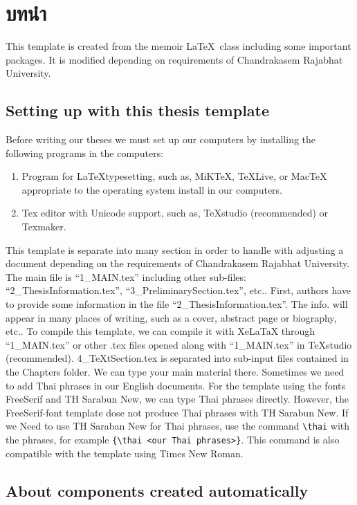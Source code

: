 \chapter{บทนำ}


This template is created from the memoir \LaTeX\ class including some important packages. It is modified depending on requirements of Chandrakasem Rajabhat University.


\section{Setting up with this thesis template}

Before writing our theses we must set up our computers by installing the following programs in the computers:
\begin{enumerate}[\quad1)]
	\item Program for \LaTeX typesetting, such as, MiKTeX, TeXLive, or MacTeX appropriate to the operating system install in our computers.
	\item Tex editor with Unicode support, such as, TeXstudio (recommended) or Texmaker.
\end{enumerate}
This template is separate into many section in order to handle with adjusting a document depending on the requirements of Chandrakasem Rajabhat University. The main file is “1\_MAIN.tex” including other sub-files: “2\_ThesisInformation.tex”, “3\_PreliminarySection.tex”, etc.. First, authors have to provide some information in the file “2\_ThesisInformation.tex”. The info. will appear in many places of writing, such as a cover, abstract page or biography, etc.. To compile this template, we can compile it with XeLaTaX through “1\_MAIN.tex” or other .tex files opened along with “1\_MAIN.tex” in TeXstudio (recommended). 4\_TeXtSection.tex is separated into sub-input files contained in the Chapters folder. We can type your main material there.
Sometimes we need to add Thai phrases in our English documents. For the template using the fonts FreeSerif and TH Sarabun New, we can type Thai phrases directly. However, the FreeSerif-font template dose not produce Thai phrases with TH Sarabun New. If we Need to use TH Saraban New for Thai phrases, use the command \verb|\thai| with the phrases, for example \verb|{\thai <our Thai phrases>}|. This command is also compatible with the template using Times New Roman.




\section{About components created automatically}

